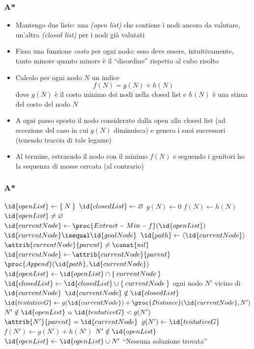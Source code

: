 \documentclass{beamer}
\renewcommand{\emptyset}{\varnothing}
\begin{document}
\begin{frame}
\frametitle{A*}
\begin{itemize}
\item Mantengo due liste: una \emph{(open list)} che contiene i nodi ancora da
valutare, un'altra \emph{(closed list)} per i nodi già valutati
\item Fisso una funzione \emph{costo} per ogni nodo: esso deve essere,
intuitivamente, tanto minore quanto minore è il ``disordine'' rispetto al cubo
risolto
\item Calcolo per ogni nodo $N$ un indice
\[
f(N) = g(N) + h(N)
\]
dove $g(N)$ è il costo minimo dei nodi nella closed list e $h(N)$ è una stima
del costo del nodo $N$
\item A ogni passo sposto il nodo considerato dalla open alla closed list (ad
eccezione del caso in cui $g(N)$ diminuisca) e genero i suoi successori
(tenendo traccia di tale legame)
\item Al termine, estraendo il nodo con il minimo $f(N)$ e seguendo i genitori
ho la sequenza di mosse cercata (al contrario)
\end{itemize}
\end{frame}

\begin{frame}
\frametitle{A*}
\tiny
\begin{codebox}
\li $\id{openList}\gets\Set{N}$
\li $\id{closedList}\gets\emptyset$
\li $g(N)\gets 0$
\li $f(N)\gets h(N)$
\li \While $\id{openList}\neq\emptyset$
\li     \Do
            $\id{currentNode}\gets\proc{Extract-Min-f}(\id{openList})$
\li         \If $\id{currentNode}\isequal\id{goalNode}$
\li         \Then
                $\id{path}\gets\Braket{\id{currentNode}}$
\li             \While $\attrib{currentNode}{parent}\neq\const{nil}$
\li             \Do
                    $\id{currentNode}\gets\attrib{currentNode}{parent}$
\li                 $\proc{Append}(\id{path}, \id{currentNode})$
                \End
\li             \Return {}
            \End
\li         $\id{openList}\gets\id{openList}\cap\Set{currentNode}$
\li         $\id{closedList}\gets\id{closedList}\cup\Set{currentNode}$
\li         \For ogni nodo $N'$ vicino di $\id{currentNode}$
\li         \Do
                \If $\id{currentNode}\notin\id{closedList}$
\li             \Then
                    $\id{tentativeG}\gets g(\id{currentNode}) +
\proc{Distance}(\id{currentNode}, N')$
\li                 \If $N'\notin\id{openList}$ o $\id{tentativeG} < g(N')$
\li                 \Then
                        $\attrib{N'}{parent} = \id{currentNode}$
\li                     $g(N')\gets\id{tentativeG}$
\li                     $f(N')\gets g(N') + h(N')$
\li                     \If $N'\notin\id{openList}$
\li                     \Then
                        $\id{openList}\gets\id{openList}\cup N'$
                        \End
                    \End
                \End
            \End
        \End
\li     \Error ``Nessuna soluzione trovata''
\end{codebox}
\end{frame}
\end{document}
